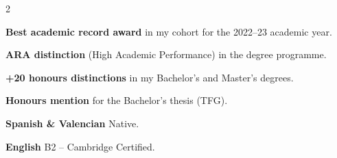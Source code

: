\documentclass{miquelcv}
\begin{document}
\begin{paracol}{2}
\begin{cvlist}
  \item \textbf{Best academic record award} in my cohort for the 2022--23 academic year.
  \item \textbf{ARA distinction} (High Academic Performance) in the degree programme.
  \item \textbf{+20 honours distinctions} in my Bachelor's and Master's degrees.
  \item \textbf{Honours mention} for the Bachelor's thesis (TFG).
\end{cvlist}


{\small\textbf{Spanish \& Valencian}}\newline
{\small Native.}\par
\vspace{4pt}
{\small\textbf{English}}\newline
{\small B2 -- Cambridge Certified.}\par

\end{paracol}
\end{document}
